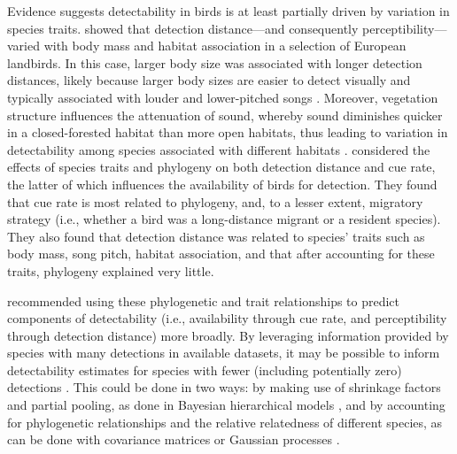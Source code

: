 \documentclass[12pt]{article}
\begin{document}
\par Evidence suggests detectability in birds is at least partially driven by variation in species traits.
\citet{johnston_species_2014} showed that detection distance---and consequently perceptibility---varied with body mass and habitat association in a selection of European landbirds.
In this case, larger body size was associated with longer detection distances, likely because  larger body sizes are easier to detect visually and typically associated with louder and lower-pitched songs \citep{bowman_adaptive_1979, fletcher_acoustics_1999, ryan_role_1985}.
Moreover, vegetation structure influences the attenuation of sound, whereby sound diminishes quicker in a closed-forested habitat than more open habitats, thus leading to variation in detectability among species associated with different habitats \citep{waide_tropical_1988, yip_sound_2017}.
\citet{solymos_phylogeny_2018} considered the effects of species traits and phylogeny on both detection distance and cue rate, the latter of which influences the availability of birds for detection.
They found that cue rate is most related to phylogeny, and, to a lesser extent, migratory strategy (i.e., whether a bird was a long-distance migrant or a resident species).
They also found that detection distance was related to species’ traits such as body mass, song pitch, habitat association, and that after accounting for these traits, phylogeny explained very little.

\par \citet{solymos_phylogeny_2018} recommended using these phylogenetic and trait relationships to predict components of detectability (i.e., availability through cue rate, and perceptibility through detection distance) more broadly.
 By leveraging information provided by species with many detections in available datasets, it may be possible to inform detectability estimates for species with fewer (including potentially zero) detections \citep{sollmann_hierarchical_2016, pacifici_guidelines_2014, zipkin_impacts_2009, white_conservation_2013}.
This could be done in two ways: by making use of shrinkage factors and partial pooling, as done in Bayesian hierarchical models \citep{gelman_what_2021, gelman_bayesian_2006}, and by accounting for phylogenetic relationships and the relative relatedness of different species, as can be done with covariance matrices or Gaussian processes \citep{bernardo_regression_1998, mcelreath_continous_2020}.
\end{document}
